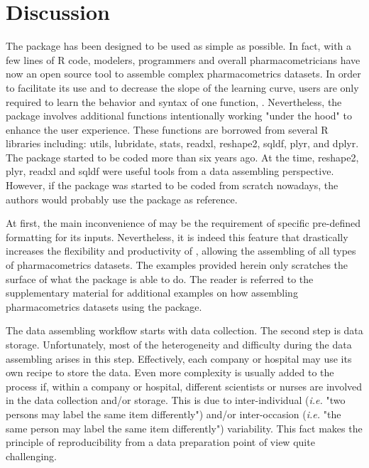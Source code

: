 \section{Discussion}
The  package has been designed to be used as simple as possible. In fact, with a few lines of R code, modelers, programmers and overall pharmacometricians have now an open source tool to assemble complex pharmacometrics datasets. In order to facilitate its use and to decrease the slope of the learning curve, users are only required to learn the behavior and syntax of one function, . Nevertheless, the  package involves additional functions intentionally working "under the hood" to enhance the user experience. These functions are borrowed from several R libraries including: utils, lubridate, stats, readxl, reshape2, sqldf, plyr, and dplyr. The  package started to be coded more than six years ago. At the time, reshape2, plyr, readxl and sqldf were useful tools from a data assembling perspective. However, if the  package was started to be coded from scratch nowadays, the authors would probably use the  package as reference. 

At first, the main inconvenience of  may be the requirement of specific pre-defined formatting for its inputs. Nevertheless, it is indeed this feature that drastically increases the flexibility and productivity of , allowing the assembling of all types of pharmacometrics datasets. The examples provided herein only scratches the surface of what the package is able to do. The reader is referred to the supplementary material for additional examples on how assembling pharmacometrics datasets using the  package. 

The data assembling workflow starts with data collection. The second step is data storage. Unfortunately, most of the heterogeneity and difficulty during the data assembling arises in this step. Effectively, each company or hospital may use its own recipe to store the data. Even more complexity is usually added to the process if, within a company or hospital, different scientists or nurses are involved in the data collection and/or storage. This is due to inter-individual (\textit{i.e.} "two persons may label the same item differently") and/or inter-occasion (\textit{i.e.} "the same person may label the same item differently") variability. This fact makes the principle of reproducibility from a data preparation point of view quite challenging. 

